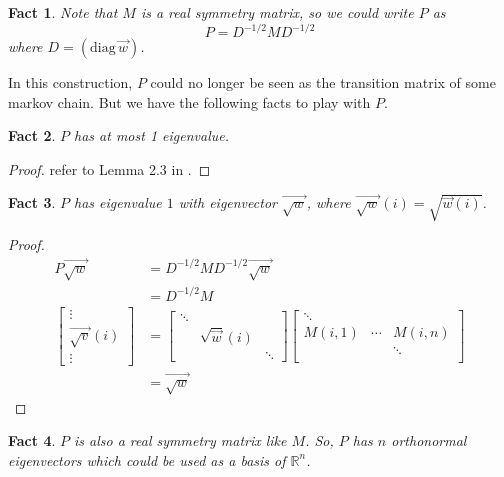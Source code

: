 \documentclass{article}
\newtheorem{fact}{Fact}[section]
\def\diag#1{(\mathrm{diag}\,#1)}
\begin{document}
\begin{fact}
  Note that $M$ is a real symmetry matrix, so we could write $P$ as
  \[P = D^{-1/2}MD^{-1/2}\]
  where $D = \diag{\vec{w}}$.
\end{fact}
  In this construction, $P$ could no longer be seen as the transition matrix of some markov chain. But we have the following facts to play with $P$.
\begin{fact}
  $P$ has at most 1 eigenvalue.
\end{fact}
\begin{proof}
  refer to Lemma 2.3 in \cite{anari2019log}.
\end{proof}
\begin{fact}
  $P$ has eigenvalue $1$ with eigenvector $\vec{\sqrt{w}}$, where $\vec{\sqrt{w}}(i) = \sqrt{\vec{w}(i)}$.
\end{fact}
\begin{proof}
  \begin{align*}
    P\vec{\sqrt{w}}
    &= D^{-1/2}MD^{-1/2}\vec{\sqrt{w}} \\
    &= D^{-1/2}M\\
    \left[
    \begin{array}{c}
      \vdots \\
      \vec{\sqrt{v}}(i) \\
      \vdots
    \end{array}
    \right]
    &= \left[
      \begin{array}{ccc}
        \ddots&& \\
        &\sqrt{\vec{w}}(i)&\\
        &&\ddots
      \end{array}
      \right]
    \left[
           \begin{array}{ccc}
             \ddots &   &  \\
             M(i, 1) & \cdots & M(i, n) \\
              &  &  \ddots\\
           \end{array}
    \right] \\
    &= \vec{\sqrt{w}}
  \end{align*}
\end{proof}

\begin{fact}
  $P$ is also a real symmetry matrix like $M$.
  So, $P$ has $n$ orthonormal eigenvectors which could be used as a basis of $\mathbb{R}^n$.
\end{fact}
\end{document}
